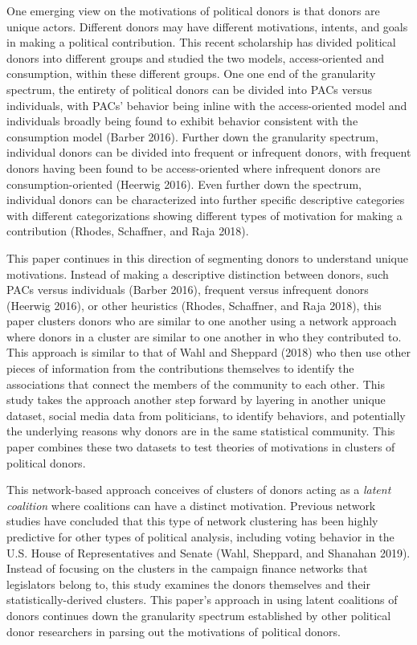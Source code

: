 \documentclass[12pt,]{article}
\begin{document}
One emerging view on the motivations of political donors is that donors
are unique actors. Different donors may have different motivations,
intents, and goals in making a political contribution. This recent
scholarship has divided political donors into different groups and
studied the two models, access-oriented and consumption, within these
different groups. One one end of the granularity spectrum, the entirety
of political donors can be divided into PACs versus individuals, with
PACs' behavior being inline with the access-oriented model and
individuals broadly being found to exhibit behavior consistent with the
consumption model (Barber 2016). Further down the granularity spectrum,
individual donors can be divided into frequent or infrequent donors,
with frequent donors having been found to be access-oriented where
infrequent donors are consumption-oriented (Heerwig 2016). Even further
down the spectrum, individual donors can be characterized into further
specific descriptive categories with different categorizations showing
different types of motivation for making a contribution (Rhodes,
Schaffner, and Raja 2018).

This paper continues in this direction of segmenting donors to
understand unique motivations. Instead of making a descriptive
distinction between donors, such PACs versus individuals (Barber 2016),
frequent versus infrequent donors (Heerwig 2016), or other heuristics
(Rhodes, Schaffner, and Raja 2018), this paper clusters donors who are
similar to one another using a network approach where donors in a
cluster are similar to one another in who they contributed to. This
approach is similar to that of Wahl and Sheppard (2018) who then use
other pieces of information from the contributions themselves to
identify the associations that connect the members of the community to
each other. This study takes the approach another step forward by
layering in another unique dataset, social media data from politicians,
to identify behaviors, and potentially the underlying reasons why donors
are in the same statistical community. This paper combines these two
datasets to test theories of motivations in clusters of political
donors.

This network-based approach conceives of clusters of donors acting as a
\emph{latent coalition} where coalitions can have a distinct motivation.
Previous network studies have concluded that this type of network
clustering has been highly predictive for other types of political
analysis, including voting behavior in the U.S. House of Representatives
and Senate (Wahl, Sheppard, and Shanahan 2019). Instead of focusing on
the clusters in the campaign finance networks that legislators belong
to, this study examines the donors themselves and their
statistically-derived clusters. This paper's approach in using latent
coalitions of donors continues down the granularity spectrum established
by other political donor researchers in parsing out the motivations of
political donors.
\end{document}
